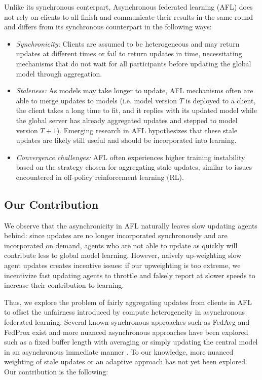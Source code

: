 \documentclass{article}
\begin{document}
Unlike its synchronous conterpart, Asynchronous federated learning (AFL) does not rely on clients to all finish and communicate their results in the same round and differs from its synchronous counterpart in the following ways:
\begin{itemize}[leftmargin=1em]
\item\emph{Synchronicity:} Clients are assumed to be heterogeneous and may return updates at different times or fail to return updates in time, necessitating mechanisms that do not wait for all participants before updating the global model through aggregation.
\item\emph{Staleness:} As models may take longer to update, AFL mechanisms often are able to merge updates to models (i.e. model version $T$ is deployed to a client, the client takes a long time to fit, and it replies with its updated model while the global server has already aggregated updates and stepped to model version $T+1$). Emerging research in AFL hypothesizes that these stale updates are likely still useful and should be incorporated into learning.
\item\emph{Convergence challenges:} AFL often experiences higher training instability based on the strategy chosen for aggregating stale updates, similar to issues encountered in off-policy reinforcement learning (RL).
\end{itemize}

\subsection{Our Contribution}

We observe that the asynchronicity in AFL naturally leaves slow updating agents behind: since updates are no longer incorporated synchronously and are incorporated on demand, agents who are not able to update as quickly will contribute less to global model learning. However, naively up-weighting slow agent updates creates incentive issues: if our upweighting is too extreme, we incentivize fast updating agents to throttle and falsely report at slower speeds to increase their contribution to learning.

Thus, we explore the problem of fairly aggregating updates from clients in AFL to offset the unfairness introduced by compute heterogeneity in asynchronous federated learning. Several known synchronous approaches such as FedAvg and FedProx exist and more nuanced asynchronous approaches have been explored such as a fixed buffer length with averaging \cite{nguyen2022federated} or simply updating the central model in an asynchronous immediate manner \cite{chen2020asynchronous}. To our knowledge, more nuanced weighting of stale updates or an adaptive approach has not yet been explored. Our contribution is the following:
\end{document}
